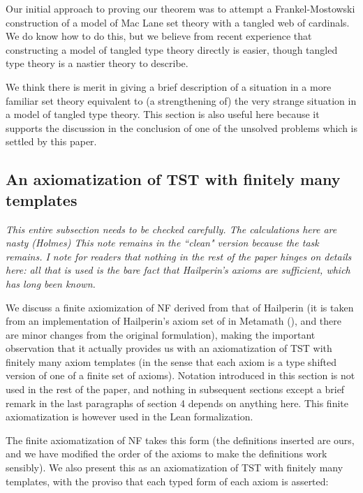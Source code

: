 \documentclass[112pt]{article}
\theoremstyle{definition}
\theoremstyle{remark}
\newcommand{\rk}[1]{{\color{blue}\sl #1}}
\newcommand{\rk}[1]{}
\begin{document}
Our initial approach to proving our theorem was to attempt a Frankel-Mostowski construction of a model of Mac Lane set theory with a tangled web of cardinals.  We do know how to do this, but we believe from recent experience that constructing a model of tangled type theory directly is easier, though tangled type theory is a nastier theory to describe.

We think there is merit in giving a brief description of a situation in a more familiar set theory equivalent to (a strengthening of) the very strange situation in a model of tangled type theory.  This section is also useful here because it supports the discussion in the conclusion of one of the unsolved problems which is settled by this paper.

\newpage

\subsection{An axiomatization of TST with finitely many templates}\label{ss:hailperin}

\rk{This entire subsection needs to be checked carefully.  The calculations here are nasty (Holmes)  This note remains in the ``clean" version because the task remains.  I note for readers that nothing in the rest of the paper hinges on details here:  all that is used is the bare fact that Hailperin's axioms are sufficient, which has long been known.}

We discuss a finite axiomization of NF derived from that of Hailperin (it is taken from an implementation of Hailperin's axiom set of \cite{hailperin} in Metamath (\cite{metamath}), and there are minor changes from the original formulation), making the important observation that it actually provides us with an axiomatization of TST with finitely many
axiom templates (in the sense that each axiom is a type shifted version of one of a finite set of axioms).  Notation introduced in this section is not used in the rest of the paper, and nothing in subsequent sections except a brief remark in the last paragraphs of section 4 depends on anything here.  This finite axiomatization is however used in the Lean formalization.

The finite axiomatization of NF takes this form (the definitions inserted are ours, and we have modified the order of the axioms to make the definitions work sensibly).  We also present this as an axiomatization of TST with finitely many templates, with the proviso that each typed form of each axiom is asserted:
\end{document}
